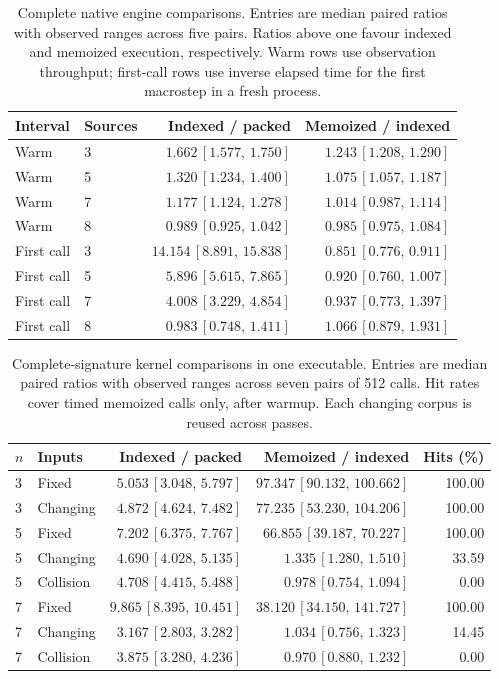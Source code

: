 \begin{table}[H]\centering\small
\caption{Complete native engine comparisons. Entries are median paired ratios with observed ranges across five pairs. Ratios above one favour indexed and memoized execution, respectively. Warm rows use observation throughput; first-call rows use inverse elapsed time for the first macrostep in a fresh process.}
\label{tab:indexedengine}
\begin{tabular}{llrr}\toprule
Interval & Sources & Indexed / packed & Memoized / indexed \\\midrule
Warm & 3 & $1.662\,[1.577,\,1.750]$ & $1.243\,[1.208,\,1.290]$ \\
Warm & 5 & $1.320\,[1.234,\,1.400]$ & $1.075\,[1.057,\,1.187]$ \\
Warm & 7 & $1.177\,[1.124,\,1.278]$ & $1.014\,[0.987,\,1.114]$ \\
Warm & 8 & $0.989\,[0.925,\,1.042]$ & $0.985\,[0.975,\,1.084]$ \\
\midrule
First call & 3 & $14.154\,[8.891,\,15.838]$ & $0.851\,[0.776,\,0.911]$ \\
First call & 5 & $5.896\,[5.615,\,7.865]$ & $0.920\,[0.760,\,1.007]$ \\
First call & 7 & $4.008\,[3.229,\,4.854]$ & $0.937\,[0.773,\,1.397]$ \\
First call & 8 & $0.983\,[0.748,\,1.411]$ & $1.066\,[0.879,\,1.931]$ \\
\bottomrule\end{tabular}
\end{table}

\begin{table}[H]\centering\small
\caption{Complete-signature kernel comparisons in one executable. Entries are median paired ratios with observed ranges across seven pairs of 512 calls. Hit rates cover timed memoized calls only, after warmup. Each changing corpus is reused across passes.}
\label{tab:indexedmicro}
\begin{tabular}{llrrr}\toprule
$n$ & Inputs & Indexed / packed & Memoized / indexed & Hits (\%) \\\midrule
3 & Fixed & $5.053\,[3.048,\,5.797]$ & $97.347\,[90.132,\,100.662]$ & 100.00 \\
3 & Changing & $4.872\,[4.624,\,7.482]$ & $77.235\,[53.230,\,104.206]$ & 100.00 \\
5 & Fixed & $7.202\,[6.375,\,7.767]$ & $66.855\,[39.187,\,70.227]$ & 100.00 \\
5 & Changing & $4.690\,[4.028,\,5.135]$ & $1.335\,[1.280,\,1.510]$ & 33.59 \\
5 & Collision & $4.708\,[4.415,\,5.488]$ & $0.978\,[0.754,\,1.094]$ & 0.00 \\
7 & Fixed & $9.865\,[8.395,\,10.451]$ & $38.120\,[34.150,\,141.727]$ & 100.00 \\
7 & Changing & $3.167\,[2.803,\,3.282]$ & $1.034\,[0.756,\,1.323]$ & 14.45 \\
7 & Collision & $3.875\,[3.280,\,4.236]$ & $0.970\,[0.880,\,1.232]$ & 0.00 \\
\bottomrule\end{tabular}
\end{table}
